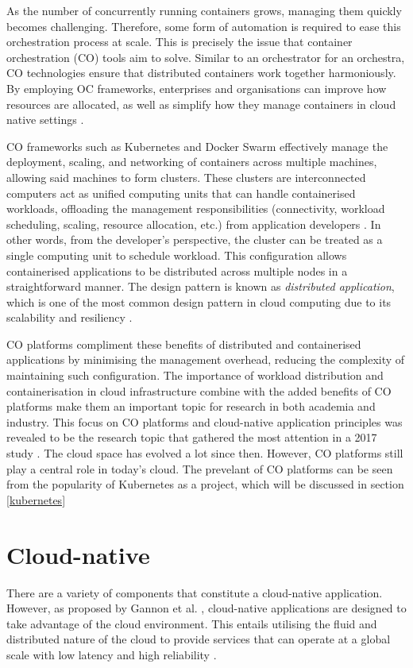 As the number of concurrently running containers grows, managing them quickly becomes challenging. Therefore, some form of automation is required to ease this orchestration process at scale. This is precisely the issue that container orchestration (CO) tools aim to solve. Similar to an orchestrator for an orchestra, CO technologies ensure that distributed containers work together harmoniously. By employing OC frameworks, enterprises and organisations can improve how resources are allocated, as well as simplify how they manage containers in cloud native settings \cite{truyenComprehensiveFeatureComparison2019}.

CO frameworks such as Kubernetes and Docker Swarm effectively manage the deployment, scaling, and networking of containers across multiple machines, allowing said machines to form clusters. These clusters are interconnected computers act as unified computing units that can handle containerised workloads, offloading the management responsibilities (connectivity, workload scheduling, scaling, resource allocation, etc.) from application developers \cite{Nodes, UsingMinikubeCreate}. In other words, from the developer's perspective, the cluster can be treated as a single computing unit to schedule workload. This configuration allows containerised applications to be distributed across multiple nodes in a straightforward manner. The design pattern is known as \textit{distributed application}, which is one of the most common design pattern in cloud computing due to its scalability and resiliency \cite{fehling2014cloud,kratzkeUnderstandingCloudnativeApplications2017}.

CO platforms compliment these benefits of distributed and containerised applications by minimising the management overhead, reducing the complexity of maintaining such configuration. The importance of workload distribution and containerisation in cloud infrastructure combine with the added benefits of CO platforms make them an important topic for research in both academia and industry. This focus on CO platforms and cloud-native application principles was revealed to be the research topic that gathered the most attention in a 2017 study \cite{kratzkeUnderstandingCloudnativeApplications2017}. The cloud space has evolved a lot since then. However, CO platforms still play a central role in today's cloud. The prevelant of CO platforms can be seen from the popularity of Kubernetes as a project, which will be discussed in section \ref{kubernetes}


\section{Cloud-native}
There are a variety of components that constitute a cloud-native application. However, as proposed by Gannon et al. \cite{gannonCloudNativeApplications2017}, cloud-native applications are designed to take advantage of the cloud environment. This entails utilising the fluid and distributed nature of the cloud to provide services that can operate at a global scale with low latency and high reliability \cite{gannonCloudNativeApplications2017}.

